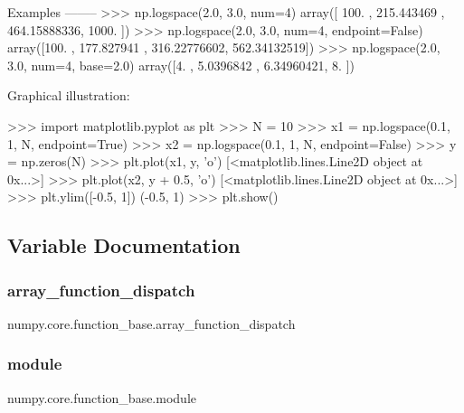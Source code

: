 \begin{DoxyVerb}
Examples
--------
>>> np.logspace(2.0, 3.0, num=4)
array([ 100.        ,  215.443469  ,  464.15888336, 1000.        ])
>>> np.logspace(2.0, 3.0, num=4, endpoint=False)
array([100.        ,  177.827941  ,  316.22776602,  562.34132519])
>>> np.logspace(2.0, 3.0, num=4, base=2.0)
array([4.        ,  5.0396842 ,  6.34960421,  8.        ])

Graphical illustration:

>>> import matplotlib.pyplot as plt
>>> N = 10
>>> x1 = np.logspace(0.1, 1, N, endpoint=True)
>>> x2 = np.logspace(0.1, 1, N, endpoint=False)
>>> y = np.zeros(N)
>>> plt.plot(x1, y, 'o')
[<matplotlib.lines.Line2D object at 0x...>]
>>> plt.plot(x2, y + 0.5, 'o')
[<matplotlib.lines.Line2D object at 0x...>]
>>> plt.ylim([-0.5, 1])
(-0.5, 1)
>>> plt.show()\end{DoxyVerb}
 

\subsection{Variable Documentation}
\mbox{\label{namespacenumpy_1_1core_1_1function__base_ab747ac78f568825def99f439f463736b}} 
\subsubsection{\texorpdfstring{array\+\_\+function\+\_\+dispatch}{array\_function\_dispatch}}
{\footnotesize\ttfamily numpy.\+core.\+function\+\_\+base.\+array\+\_\+function\+\_\+dispatch}

\mbox{\label{namespacenumpy_1_1core_1_1function__base_aed21068da2537f63888b104d1d128db2}} 
\subsubsection{\texorpdfstring{module}{module}}
{\footnotesize\ttfamily numpy.\+core.\+function\+\_\+base.\+module}

